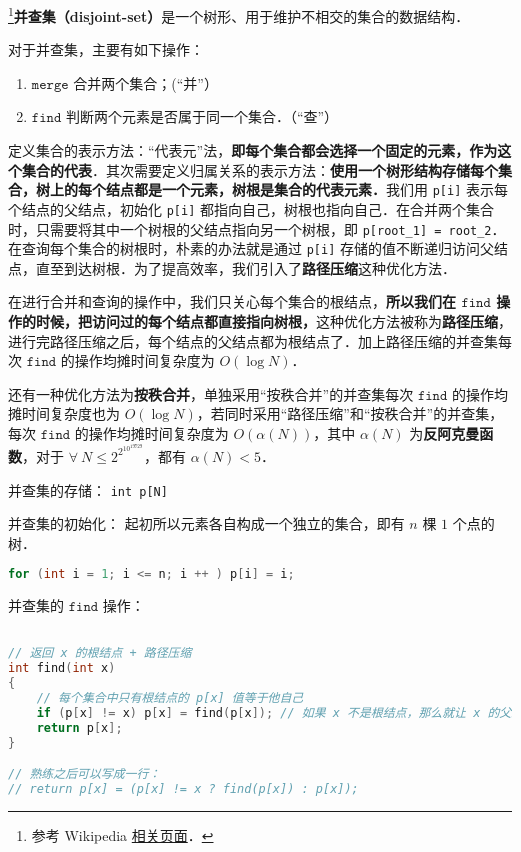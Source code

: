 
\footnote{参考 Wikipedia \href{https://en.wikipedia.org/wiki/Disjoint-set_data_structure}{相关页面}．}\textbf{并查集（disjoint-set）}是一个树形、用于维护不相交的集合的数据结构．

对于并查集，主要有如下操作：
\begin{enumerate}
\item $\mathtt{merge}$ 合并两个集合；(“并”）

\item $\mathtt{find}$ 判断两个元素是否属于同一个集合．（“查”）
\end{enumerate}

定义集合的表示方法：“代表元”法，\textbf{即每个集合都会选择一个固定的元素，作为这个集合的代表}．其次需要定义归属关系的表示方法：\textbf{使用一个树形结构存储每个集合，树上的每个结点都是一个元素，树根是集合的代表元素．}我们用 \verb|p[i]| 表示每个结点的父结点，初始化 \verb|p[i]| 都指向自己，树根也指向自己．在合并两个集合时，只需要将其中一个树根的父结点指向另一个树根，即 \verb|p[root_1] = root_2|．在查询每个集合的树根时，朴素的办法就是通过 \verb|p[i]| 存储的值不断递归访问父结点，直至到达树根．为了提高效率，我们引入了\textbf{路径压缩}这种优化方法．

在进行合并和查询的操作中，我们只关心每个集合的根结点，\textbf{所以我们在 $\mathtt{find}$ 操作的时候，把访问过的每个结点都直接指向树根，}这种优化方法被称为\textbf{路径压缩}，进行完路径压缩之后，每个结点的父结点都为根结点了．加上路径压缩的并查集每次 $\mathtt{find}$ 的操作均摊时间复杂度为 $O(\log N)$．

还有一种优化方法为\textbf{按秩合并}，单独采用“按秩合并”的并查集每次 $\mathtt{find}$ 的操作均摊时间复杂度也为 $O(\log N)$，若同时采用“路径压缩”和“按秩合并”的并查集，每次 $\mathtt{find}$ 的操作均摊时间复杂度为 $O(\alpha(N))$，其中 $\alpha(N)$ 为\textbf{反阿克曼函数}，对于 $\forall \ N \leq 2^{2^{10^{19729}}}$，都有 $\alpha(N) < 5$．

并查集的存储：
\verb|int p[N]|

并查集的初始化：
起初所以元素各自构成一个独立的集合，即有 $n$ 棵 $1$ 个点的树．
\begin{lstlisting}[language=cpp]
for (int i = 1; i <= n; i ++ ) p[i] = i;
\end{lstlisting}

并查集的 $\mathtt{find}$ 操作：
\begin{lstlisting}[language=cpp]

// 返回 x 的根结点 + 路径压缩
int find(int x)
{
    // 每个集合中只有根结点的 p[x] 值等于他自己
    if (p[x] != x) p[x] = find(p[x]); // 如果 x 不是根结点，那么就让 x 的父结点直接等于根结点
    return p[x];
}

// 熟练之后可以写成一行：
// return p[x] = (p[x] != x ? find(p[x]) : p[x]);
\end{lstlisting}

